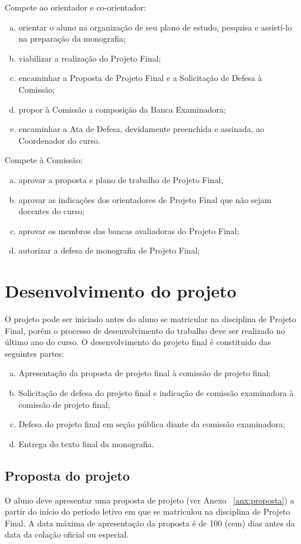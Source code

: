 Compete ao orientador e co-orientador:
\begin{enumerate}[a.]
\item orientar o aluno na organização de seu plano de estudo, pesquisa e assistí-lo na preparação da monografia;
\item viabilizar a realização do Projeto Final;
\item encaminhar a Proposta de Projeto Final e a Solicitação de Defesa à Comissão;
\item propor à Comissão a composição da Banca Examinadora;
\item encaminhar a Ata de Defesa, devidamente preenchida e assinada, ao Coordenador do curso.
\end{enumerate}

Compete à Comissão:
\begin{enumerate}[a.]
\item aprovar a proposta e plano de trabalho de Projeto Final;
\item aprovar as indicações dos orientadores de Projeto Final que não sejam docentes do curso;
\item aprovar os membros das bancas avaliadoras do Projeto Final;
\item autorizar a defesa de monografia de Projeto Final;
\end{enumerate}

\section{Desenvolvimento do projeto}

O projeto pode ser iniciado antes do aluno se matricular na disciplina de Projeto Final, porém o 
processo de desenvolvimento do trabalho deve ser realizado no último ano do curso. O desenvolvimento
do projeto final é constituido das seguintes partes:

\begin{enumerate}[a.]
\item Apresentação da proposta de projeto final à comissão de projeto final;
\item Solicitação de defesa do projeto final e indicação de comissão examinadora à comissão de projeto final;
\item Defesa do projeto final em seção pública diante da comissão examinadora;
\item Entrega do texto final da monografia.
\end{enumerate}


\subsection{Proposta do projeto} 
\label{sec:proposta}
O aluno deve apresentar uma proposta de projeto (ver Anexo ~\ref{anx:proposta}) a partir do início do período
letivo em que se matriculou na disciplina de Projeto Final. A data máxima de apresentação da
proposta é de 100 (cem) dias antes da data da colação oficial ou especial.


